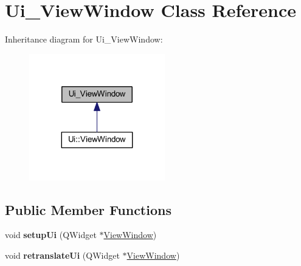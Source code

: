 \hypertarget{class_ui___view_window}{}\section{Ui\+\_\+\+View\+Window Class Reference}
\label{class_ui___view_window}


Inheritance diagram for Ui\+\_\+\+View\+Window\+:
\nopagebreak
\begin{figure}[H]
\begin{center}
\leavevmode
\includegraphics[width=167pt]{class_ui___view_window__inherit__graph}
\end{center}
\end{figure}
\subsection*{Public Member Functions}
\begin{DoxyCompactItemize}
\item 
\mbox{\label{class_ui___view_window_ae518c45a0141518ec16947cbf5eee3fb}} 
void {\bfseries setup\+Ui} (Q\+Widget $\ast$\mbox{\hyperlink{class_view_window}{View\+Window}})
\item 
\mbox{\label{class_ui___view_window_a6f1b9fe6e15e336d2a9821ffbbcc561e}} 
void {\bfseries retranslate\+Ui} (Q\+Widget $\ast$\mbox{\hyperlink{class_view_window}{View\+Window}})
\end{DoxyCompactItemize}
